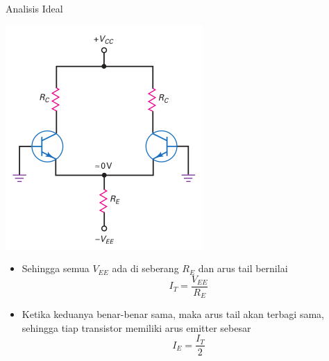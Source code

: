 \documentclass[aspectratio=169]{beamer}
\begin{document}
\begin{frame}{Analisis Ideal}
	\begin{multicols}{2}
		\begin{center}
			\includegraphics[width=0.7\textheight]{gambar/01.ideal_dc_analysis}
		\end{center}
		\columnbreak
		\begin{itemize}
			\item Sehingga semua $ V_{EE} $ ada di seberang $ R_E $ dan arus tail bernilai
			\begin{equation} \label{pers.5}
				I_T = \frac{V_{EE}}{R_E}
			\end{equation}
			\item Ketika keduanya benar-benar sama, maka arus tail akan terbagi sama, sehingga tiap transistor memiliki arus emitter sebesar \\
			\begin{equation} \label{pers.6}
				I_{E} = \frac{I_T}{2}
			\end{equation}
		\end{itemize}
		\vfill\null
	\end{multicols}
\end{frame}
\end{document}
